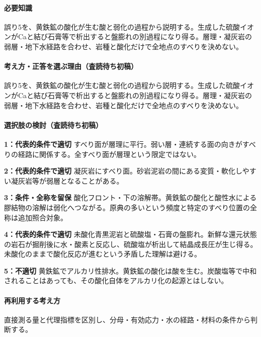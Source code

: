 \paragraph{必要知識} 誤り5を、黄鉄鉱の酸化が生む酸と弱化の過程から説明する。生成した硫酸イオンがCaと結び石膏等で析出すると盤膨れの別過程になり得る。層理・凝灰岩の弱層・地下水経路を合わせ、岩種と酸化だけで全地点のすべりを決めない。

\paragraph{考え方・正答を選ぶ理由（査読待ち初稿）} 誤り5を、黄鉄鉱の酸化が生む酸と弱化の過程から説明する。生成した硫酸イオンがCaと結び石膏等で析出すると盤膨れの別過程になり得る。層理・凝灰岩の弱層・地下水経路を合わせ、岩種と酸化だけで全地点のすべりを決めない。

\paragraph{選択肢の検討（査読待ち初稿）}\mbox{}\par

\noindent\textbf{1：代表的条件で適切} すべり面が層理に平行。弱い層・連続する面の向きがすべりの経路に関係する。全すべり面が層理という限定ではない。\par

\noindent\textbf{2：代表的条件で適切} 凝灰岩にすべり面。砂岩泥岩の間にある変質・軟化しやすい凝灰岩等が弱層となることがある。\par

\noindent\textbf{3：条件・全称を留保} 酸化フロント・下の溶解帯。黄鉄鉱の酸化と酸性水による膠結物の溶解は弱化へつながる。原典の多いという頻度と特定のすべり位置の全称は追加照合対象。\par

\noindent\textbf{4：代表的条件で適切} 未酸化青黒泥岩と硫酸塩・石膏の盤膨れ。新鮮な還元状態の岩石が掘削後に水・酸素と反応し、硫酸塩が析出して結晶成長圧が生じ得る。未酸化のままで酸化反応が進むという矛盾した理解は避ける。\par

\noindent\textbf{5：不適切} 黄鉄鉱でアルカリ性排水。黄鉄鉱の酸化は酸を生む。炭酸塩等で中和されることはあっても、その酸化自体をアルカリ化の起源とはしない。\par

\paragraph{再利用する考え方} 直接測る量と代理指標を区別し、分母・有効応力・水の経路・材料の条件から判断する。

